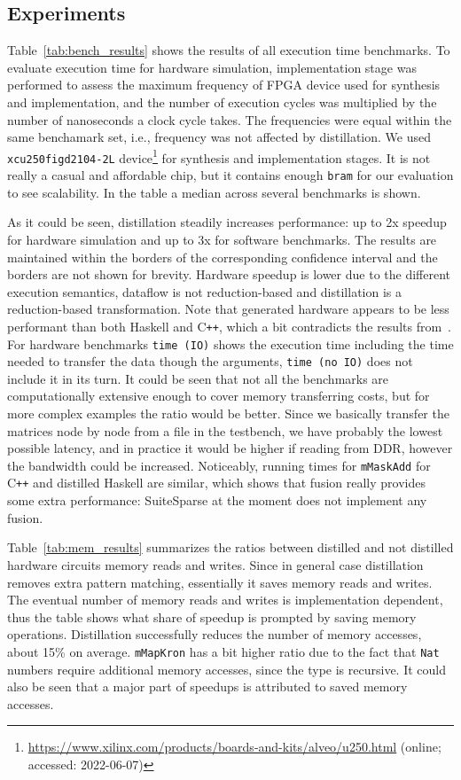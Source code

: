 \subsection{Experiments}

Table~\ref{tab:bench_results} shows the results of all execution time benchmarks. To evaluate execution time for hardware simulation, implementation stage was performed to assess the maximum frequency of FPGA device used for synthesis and implementation, and the number of execution cycles was multiplied by the number of nanoseconds a clock cycle takes. The frequencies were equal within the same benchamark set, i.e., frequency was not affected by distillation. We used \texttt{xcu250figd2104-2L} device\footnote{\url{https://www.xilinx.com/products/boards-and-kits/alveo/u250.html}  (online; accessed:
2022-06-07)} for synthesis and implementation stages. It is not really a casual and affordable chip, but it contains enough \texttt{bram} for our evaluation to see scalability. In the table a median across several benchmarks is shown. 

As it could be seen, distillation steadily increases performance: up to 2x speedup for hardware simulation and up to 3x for software benchmarks. The results are maintained within the borders of the corresponding confidence interval and the borders are not shown for brevity. Hardware speedup is lower due to the different execution semantics, dataflow is not reduction-based and distillation is a reduction-based transformation. Note that generated hardware appears to be less performant than both Haskell and C\texttt{++}, which a bit contradicts the results from~\cite{oldfhw}. For hardware benchmarks \texttt{time (IO)} shows the execution time including the time needed to transfer the data though the arguments, \texttt{time (no IO)} does not include it in its turn. It could be seen that not all the benchmarks are computationally extensive enough to cover memory transferring costs, but for more complex examples the ratio would be better. Since we basically transfer the matrices node by node from a file in the testbench, we have probably the lowest possible latency, and in practice it would be higher if reading from DDR, however the bandwidth could be increased. Noticeably, running times for \texttt{mMaskAdd} for C\texttt{++} and distilled Haskell are similar, which shows that fusion really provides some extra performance: SuiteSparse at the moment does not implement any fusion.

Table~\ref{tab:mem_results} summarizes the ratios between distilled and not distilled hardware circuits memory reads and writes. Since in general case distillation removes extra pattern matching, essentially it saves memory reads and writes. The eventual number of memory reads and writes is implementation dependent, thus the table shows what share of speedup is prompted by saving memory operations. Distillation successfully reduces the number of memory accesses, about 15\% on average. \texttt{mMapKron} has a bit higher ratio due to the fact that \texttt{Nat} numbers require additional memory accesses, since the type is recursive. It could also be seen that a major part of speedups is attributed to saved memory accesses. 

